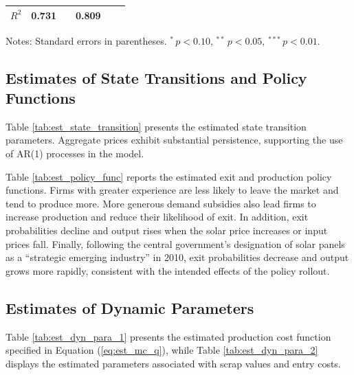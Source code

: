 \documentclass[12pt]{article}
\providecommand{\sym}[1]{\ensuremath{^{#1}}}
\begin{document}
\begin{table}[tbh]
\begin{threeparttable}
\begin{tabularx}{0.85\textwidth}{Xlllllll}
\midrule
\(R^2\)                      & \multicolumn{2}{c}{0.731} &&  \multicolumn{2}{c}{0.809} \\
\bottomrule
\end{tabularx}
\begin{tablenotes}
\footnotesize
\item Notes: %
Standard errors in parentheses.
\sym{*}\,$p<0.10$, \sym{**}\,$p<0.05$, \sym{***}\,$p<0.01$.
\end{tablenotes}
\end{threeparttable}
\end{table}


\subsection{Estimates of State Transitions and Policy Functions}
\label{subsec:est_results_first_stage}

Table \ref{tab:est_state_transition} presents the estimated state transition parameters.
Aggregate prices exhibit substantial persistence, supporting the use of AR(1) processes in the model. 

Table \ref{tab:est_policy_func} reports the estimated exit and production policy functions. Firms with greater experience are less likely to leave the market and tend to produce more. More generous demand subsidies also lead firms to increase production and reduce their likelihood of exit. In addition, exit probabilities decline and output rises when the solar price increases or input prices fall. Finally, following the central government’s designation of solar panels as a “strategic emerging industry” in 2010, exit probabilities decrease and output grows more rapidly, consistent with the intended effects of the policy rollout.



\subsection{Estimates of Dynamic Parameters}
\label{subsec:est_results_dyn_para}
Table \ref{tab:est_dyn_para_1} presents the estimated production cost function specified in Equation (\ref{eq:est_mc_q}), while Table \ref{tab:est_dyn_para_2} displays the estimated parameters associated with scrap values and entry costs.
\end{document}
